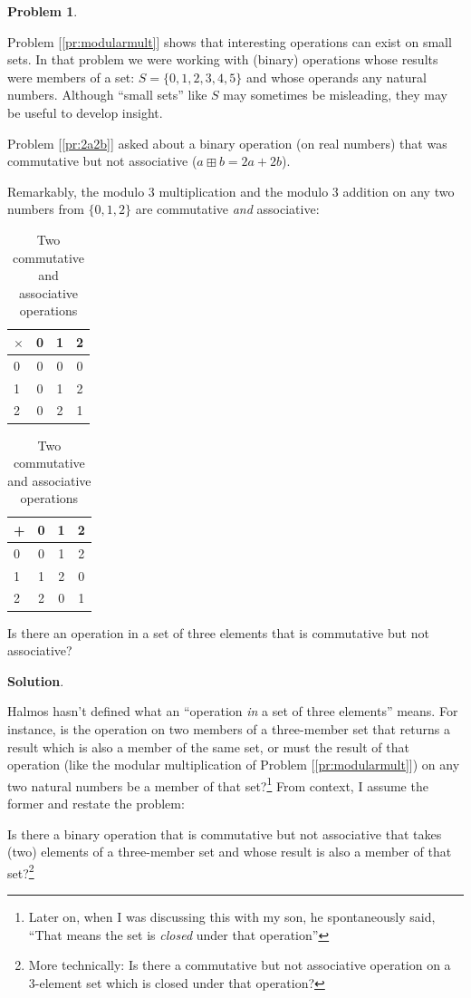 \documentclass[english,notitlepage,smartquotes]{hgbreport}
\theoremstyle{definition}
\theoremstyle{definition}
\newtheorem{problem}{Problem}
\theoremstyle{remark}
\theoremstyle{plain}
\theoremstyle{definition}
\theoremstyle{definition}
\begin{document}
\begin{problem}
\label{pr:smallsets}
\end{problem}
Problem [\ref{pr:modularmult}] shows that interesting operations can exist on small sets. In that problem we were working with (binary) operations whose results were members of a set: $S=\{0,1,2,3,4,5\}$ and whose operands any natural numbers. Although ``small sets'' like $S$ may sometimes be misleading, they may be useful to develop insight.

Problem [\ref{pr:2a2b}] asked about a binary operation (on real numbers) that was commutative but not associative ($a\boxplus b=2a+2b$).

Remarkably, the modulo 3 multiplication and the modulo 3 addition on any two numbers from $\{0,1,2\}$ are commutative \textit{and} associative:

\begin{table}[h!]
\centering
\begin{tabular}{l|ccc}
$\times$&0&1&2\\
\hline
0&0&0&0\\
1&0&1&2\\
2&0&2&1\\
\end{tabular}
\quad\quad\quad
\begin{tabular}{l|ccc}
+&0&1&2\\
\hline
0&0&1&2\\
1&1&2&0\\
2&2&0&1\\
\end{tabular}
\caption{Two commutative and associative operations}
\label{tab:twoops}
\end{table}

Is there an operation in a set of three elements that is commutative but not associative?

\textbf{Solution}.

Halmos hasn't defined what an ``operation \textit{in} a set of three elements'' means. For instance, is the operation on two members of a three-member set that returns a result which is also a member of the same set, or must the result of that operation (like the modular multiplication of Problem [\ref{pr:modularmult}]) on any two natural numbers be a member of that set?\footnote{Later on, when I was discussing this with my son, he spontaneously said, ``That means the set is \emph{closed} under that operation''} From context, I assume the former and restate the problem:

Is there a binary operation that is commutative but not associative that takes (two) elements of a three-member set and whose result is also a member of that set?\footnote{More technically: Is there a commutative but not associative operation on a 3-element set which is closed under that operation?}
\end{document}
